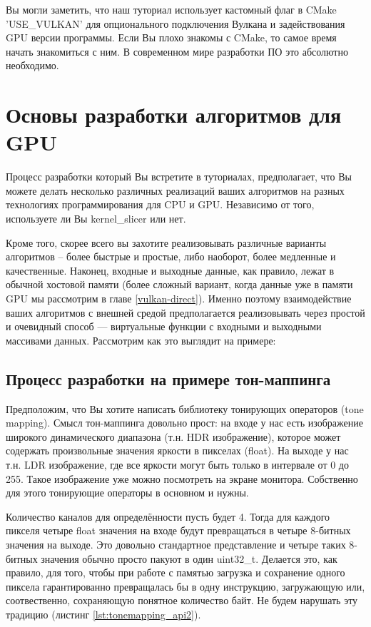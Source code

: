 \documentclass[11pt,fleqn,english,russian]{report} %
\begin{document}
\begin{remark} 
Вы могли заметить, что наш туториал использует кастомный флаг в CMake 'USE\_VULKAN' для опционального подключения Вулкана и задействования GPU версии программы. Если Вы плохо знакомы с CMake, то самое время начать знакомиться с ним. В современном мире разработки ПО это абсолютно необходимо. 
\end{remark}

\chapter{Основы разработки алгоритмов для GPU}

Процесс разработки который Вы встретите в туториалах, предполагает, что Вы можете делать несколько различных реализаций ваших алгоритмов на разных технологиях программирования для CPU и GPU. Независимо от того, используете ли Вы kernel\_slicer или нет. 

Кроме того, скорее всего вы захотите реализовывать различные варианты алгоритмов -- более быстрые и простые, либо наоборот, более медленные и качественные. Наконец, входные и выходные данные, как правило, лежат в обычной хостовой памяти (более сложный вариант, когда данные уже в памяти GPU мы рассмотрим в главе \ref{vulkan-direct}). Именно поэтому взаимодействие ваших алгоритмов с внешней средой предполагается реализовывать через простой и очевидный способ --- виртуальные функции с входными и выходными массивами данных. Рассмотрим как это выглядит на примере: 

\section{Процесс разработки на примере тон-маппинга}

Предположим, что Вы хотите написать библиотеку тонирующих операторов (tone mapping). Смысл тон-маппинга довольно прост: на входе у нас есть изображение широкого динамического диапазона (т.н. HDR изображение), которое может содержать произвольные значения яркости в пикселах (float). На выходе у нас т.н. LDR изображение, где все яркости могут быть только в интервале от 0 до 255. Такое изображение уже можно посмотреть на экране монитора. Собственно для этого тонирующие операторы в основном и нужны.

Количество каналов для определённости пусть будет 4. Тогда для каждого пикселя четыре float значения на входе будут превращаться в четыре 8-битных значения на выходе. Это довольно стандартное представление и четыре таких 8-битных значения обычно просто пакуют в один uint32\_t. Делается это, как правило, для того, чтобы при работе с памятью загрузка и сохранение одного пиксела гарантированно превращалась бы в одну инструкцию, загружающую или, соотвественно, сохраняющую понятное количество байт. Не будем нарушать эту традицию (листинг \ref{lst:tonemapping_api2}).
\end{document}
